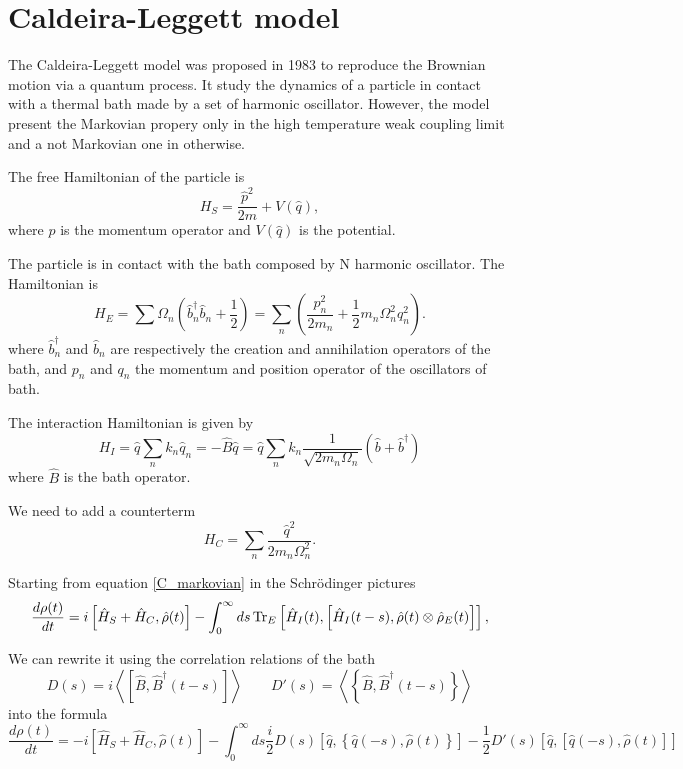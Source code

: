 \section{Caldeira-Leggett model}

The Caldeira-Leggett model was proposed in 1983 to reproduce the Brownian motion via a quantum process.
It study the dynamics of a particle in contact with a thermal bath made by a set of harmonic oscillator.
However, the model present the Markovian propery only in the high temperature weak coupling limit and a not Markovian one in otherwise.

The free Hamiltonian of the particle is
\begin{equation}
    H_S = \frac{\hat p^2}{2m} + V(\hat q),
\end{equation}
where $\hat p$ is the momentum operator and $V(\hat q)$ is the potential.

The particle is in contact with the bath composed by N harmonic oscillator. The Hamiltonian is
\begin{equation}
    H_E = \sum\Omega_n(\hat b_n^\dagger\hat b_n+\frac{1}{2})= \sum_n \left(\frac{p_n^2}{2m_n}+ \frac{1}{2}m_n\Omega_n^2q_n^2\right).
\end{equation}
where $\hat b_n^\dagger$ and $\hat b_n$ are respectively the creation and annihilation operators of the bath, and $p_n$ and $q_n$ the momentum and position operator of the oscillators of bath.

The interaction Hamiltonian is given by
\begin{equation}
    H_I = \hat q\sum_n k_n \hat q_n = - \hat B \hat q = \hat q \sum_n k_n\frac{1}{\sqrt{2m_n\Omega_n}}\left(\hat b+ \hat b^\dagger\right)
\end{equation}
where $\hat B$ is the bath operator.

We need to add a counterterm 
\begin{equation}
    H_C = \sum_n \frac{\hat q^2}{2m_n\Omega_n^2}. 
\end{equation}

Starting from equation \eqref{C_markovian} in the Schrödinger pictures
\begin{equation}
    \frac{d \rho(t)}{dt} = i\left[\hat H_S+ \hat H_C, \hat\rho(t)\right] -\int_0^\infty ds \operatorname{Tr}_E\left[\hat H_I(t),\left[\hat H_I(t-s),\hat\rho(t)\otimes\hat\rho_E(t)\right]\right],
\end{equation}

We can rewrite it using the correlation relations of the bath
\begin{equation}
    D(s) =i \left<\left[\hat B, \hat B^\dagger(t-s)\right]\right> \qquad D'(s) = \left<\left\{\hat B, \hat B^\dagger(t-s)\right\}\right>
\end{equation}
into the formula 
\begin{equation}\label{CL_master_eq}
    \frac{d \rho(t)}{dt} = -i\left[\hat H_S+ \hat H_C, \hat\rho(t)\right] -\int_0^\infty ds \frac{i}{2} D(s)\left[\hat q, \left\{\hat q(-s), \hat \rho(t)\right\}\right] - \frac{1}{2} D'(s)\left[\hat q, \left[\hat q(-s), \hat\rho(t)\right]\right]  
\end{equation}

